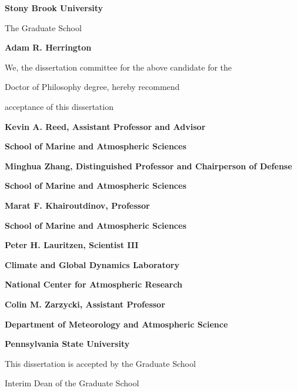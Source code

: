 \documentclass[12pt]{article}
\begin{document}
\centerline{\bf{Stony Brook University}}
\vspace*{1\baselineskip}
\centerline{The Graduate School}
\vspace*{2\baselineskip}
\centerline{\bf{Adam R. Herrington}}
\vspace*{2\baselineskip}
\centerline{We, the dissertation committee for the above candidate for the}
\vspace*{1\baselineskip}
\centerline{Doctor of Philosophy degree, hereby recommend}
\vspace*{1\baselineskip}
\centerline{acceptance of this dissertation}
\vspace*{2\baselineskip}
\centerline{\bf{Kevin A. Reed, Assistant Professor and Advisor}}
\centerline{\bf{School of Marine and Atmospheric Sciences}}
\vspace*{1\baselineskip}
\centerline{\bf{Minghua Zhang, Distinguished Professor and Chairperson of Defense}}
\centerline{\bf{School of Marine and Atmospheric Sciences}}
\vspace*{1\baselineskip}
\centerline{\bf{Marat F. Khairoutdinov, Professor}}
\centerline{\bf{School of Marine and Atmospheric Sciences}}
\vspace*{1\baselineskip}
\centerline{\bf{Peter H. Lauritzen, Scientist III}}
\centerline{\bf{Climate and Global Dynamics Laboratory}} 
\centerline{\bf{National Center for Atmospheric Research}}
\vspace*{1\baselineskip}
\centerline{\bf{Colin M. Zarzycki, Assistant Professor}}
\centerline{\bf{Department of Meteorology and Atmospheric Science}} 
\centerline{\bf{Pennsylvania State University}}
\vspace*{2\baselineskip}
\centerline{This dissertation is accepted by the Graduate School}
\vspace*{3\baselineskip}
\centerline{Interim Dean of the Graduate School}
\end{document}
